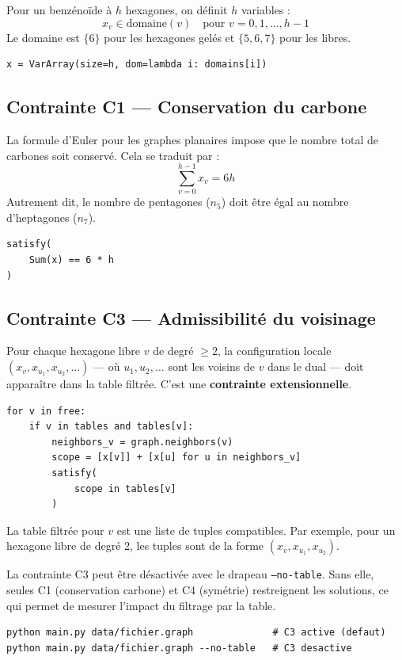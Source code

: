 \documentclass[12pt,a4paper]{article}
\theoremstyle{definition}
\begin{document}
Pour un benzénoïde à $h$ hexagones, on définit $h$ variables :
\[
  x_v \in \text{domaine}(v) \quad \text{pour } v = 0, 1, \ldots, h-1
\]
Le domaine est $\{6\}$ pour les hexagones gelés et $\{5, 6, 7\}$ pour les libres.

\begin{lstlisting}
x = VarArray(size=h, dom=lambda i: domains[i])
\end{lstlisting}

\subsection{Contrainte C1 — Conservation du carbone}

La formule d'Euler pour les graphes planaires impose que le nombre total de carbones soit
conservé. Cela se traduit par :
\[
  \sum_{v=0}^{h-1} x_v = 6h
\]
Autrement dit, le nombre de pentagones ($n_5$) doit être égal au nombre d'heptagones ($n_7$).

\begin{lstlisting}
satisfy(
    Sum(x) == 6 * h
)
\end{lstlisting}

\subsection{Contrainte C3 — Admissibilité du voisinage}

Pour chaque hexagone libre $v$ de degré $\geq 2$, la configuration locale
$(x_v, x_{u_1}, x_{u_2}, \ldots)$ — où $u_1, u_2, \ldots$ sont les voisins de $v$ dans le
dual — doit apparaître dans la table filtrée. C'est une \textbf{contrainte extensionnelle}.

\begin{lstlisting}
for v in free:
    if v in tables and tables[v]:
        neighbors_v = graph.neighbors(v)
        scope = [x[v]] + [x[u] for u in neighbors_v]
        satisfy(
            scope in tables[v]
        )
\end{lstlisting}

La table filtrée pour $v$ est une liste de tuples compatibles. Par exemple, pour un hexagone
libre de degré 2, les tuples sont de la forme $(x_v, x_{u_1}, x_{u_2})$.

\begin{remarque}
  La contrainte C3 peut être désactivée avec le drapeau \texttt{--no-table}. Sans elle,
  seules C1 (conservation carbone) et C4 (symétrie) restreignent les solutions, ce qui
  permet de mesurer l'impact du filtrage par la table.
  \begin{lstlisting}[style=benzai]
python main.py data/fichier.graph              # C3 active (defaut)
python main.py data/fichier.graph --no-table   # C3 desactive
  \end{lstlisting}
\end{remarque}
\end{document}
